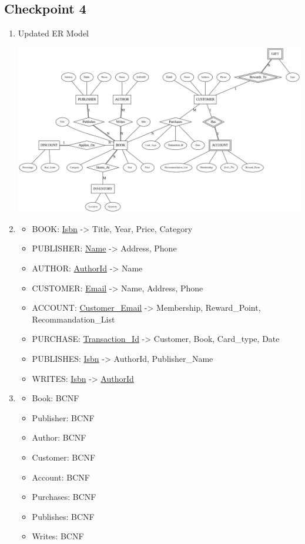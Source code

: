 \documentclass[12pt, letterpaper]{report}
\begin{document}
\subsection{Checkpoint 4}
\begin{enumerate}
  \item Updated ER Model

    \includegraphics[width=\linewidth]{Section3/ER3.png}

  \item
    \begin{itemize}
    \item BOOK: \underline{Isbn} -> {Title, Year, Price, Category}
    \item PUBLISHER: \underline{Name} -> {Address, Phone}
    \item AUTHOR: \underline{AuthorId} -> Name
    \item CUSTOMER: \underline{Email} -> {Name, Address, Phone}
    \item ACCOUNT: \underline{Customer\_Email} -> {Membership, Reward\_Point, Recommandation\_List}
    \item PURCHASE: \underline{Transaction\_Id} -> {Customer, Book, Card\_type, Date}
    \item PUBLISHES: \underline{Isbn} -> {AuthorId, Publisher\_Name}
    \item WRITES: \underline{Isbn} -> \underline{AuthorId}
    \end{itemize}

  \item
    \begin{itemize}
      \item Book: BCNF
      \item Publisher: BCNF
      \item Author: BCNF
      \item Customer: BCNF
      \item Account: BCNF
      \item Purchases: BCNF
      \item Publishes: BCNF
      \item Writes: BCNF
    \end{itemize}


\end{enumerate}
\end{document}
